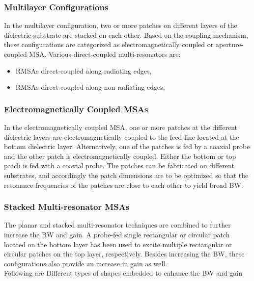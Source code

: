 \documentclass[12pt]{article}
\begin{document}
				         \subsubsection{Multilayer Configurations}
				          \justify
				            In the multilayer configuration, two or more patches on different layers of the dielectric substrate are stacked on each other. Based on the coupling mechanism, these configurations are categorized as electromagnetically coupled or aperture-coupled MSA.
				            Various direct-coupled multi-resonators are:
				            \begin{itemize}
				            	\item    RMSAs direct-coupled along radiating edges,
				            	\item    RMSAs direct-coupled along non-radiating edges, 
				            \end{itemize}
				          \subsubsection{Electromagnetically Coupled MSAs}
				            \justify
				              In the electromagnetically coupled MSA, one or more patches at the different dielectric layers are electromagnetically coupled to the feed line located at the bottom dielectric layer.
				              Alternatively, one of the patches is fed by a coaxial probe and the other patch is electromagnetically coupled. Either the bottom or top patch is fed with a coaxial probe. The patches can be fabricated on different substrates, and accordingly the patch dimensions are to be optimized so that the resonance frequencies of the patches are close to each other to yield broad BW.
				            \subsubsection{ Stacked Multi-resonator MSAs}
				              \justify
				                The planar and stacked multi-resonator techniques are combined to further increase the BW and gain. A probe-fed single rectangular or circular patch located on the bottom layer has been used to excite multiple rectangular or circular patches on the top layer, respectively. Besides increasing the BW, these configurations also provide an increase in gain as well. \\
				                

	   		                	Following are Different types of shapes embedded to enhance the BW and gain 
	   		                	
\end{document}
